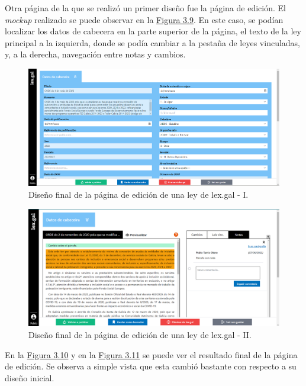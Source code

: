 Otra página de la que se realizó un primer diseño fue la página de edición. El {\it mockup} realizado se puede observar en la \hyperref[enlaceMockupEdicionDiseno]{Figura 3.9}. En este caso, se podían localizar los datos de cabecera en la parte superior de la página, el texto de la ley principal a la izquierda, donde se podía cambiar a la pestaña de leyes vinculadas, y, a la derecha, navegación entre notas y cambios.

\begin{figure}[H]
\centerline{\includegraphics[width=15cm]{figuras/manualUsuario/EditarCabecera.PNG}}
\caption{Diseño final de la página de edición de una ley de lex.gal - I.}
\label{enlaceCabeceraDiseno}
\end{figure}

\begin{figure}[H]
\centerline{\includegraphics[width=15cm]{figuras/manualUsuario/PestanaNotas.PNG}}
\caption{Diseño final de la página de edición de una ley de lex.gal - II.}
\label{enlaceEdicionLexGalDiseno}
\end{figure}

En la \hyperref[enlaceCabeceraDiseno]{Figura 3.10} y en la \hyperref[enlaceEdicionLexGalDiseno]{Figura 3.11} se puede ver el resultado final de la página de edición. Se observa a simple vista que esta cambió bastante con respecto a su diseño inicial.
\\

